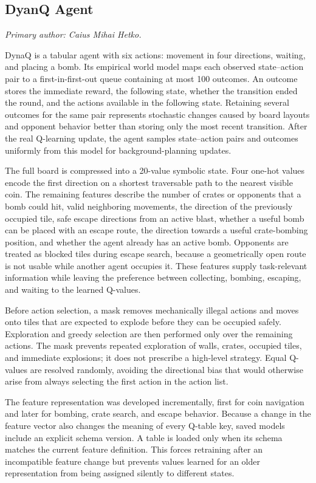 \documentclass[article, 10pt]{IEEEtran}
\begin{document}
\subsection{DyanQ Agent}\label{subsec:DynaQ Methods}\label{sec:dyna_method}

\textit{Primary author: Caius Mihai Hetko.}

DynaQ is a tabular agent with six actions: movement in four directions, waiting, and placing a bomb. Its empirical world model maps each observed state--action pair to a first-in-first-out queue containing at most 100 outcomes. An outcome stores the immediate reward, the following state, whether the transition ended the round, and the actions available in the following state. Retaining several outcomes for the same pair represents stochastic changes caused by board layouts and opponent behavior better than storing only the most recent transition. After the real Q-learning update, the agent samples state--action pairs and outcomes uniformly from this model for background-planning updates.

The full board is compressed into a 20-value symbolic state. Four one-hot values encode the first direction on a shortest traversable path to the nearest visible coin. The remaining features describe the number of crates or opponents that a bomb could hit, valid neighboring movements, the direction of the previously occupied tile, safe escape directions from an active blast, whether a useful bomb can be placed with an escape route, the direction towards a useful crate-bombing position, and whether the agent already has an active bomb. Opponents are treated as blocked tiles during escape search, because a geometrically open route is not usable while another agent occupies it. These features supply task-relevant information while leaving the preference between collecting, bombing, escaping, and waiting to the learned Q-values.

Before action selection, a mask removes mechanically illegal actions and moves onto tiles that are expected to explode before they can be occupied safely. Exploration and greedy selection are then performed only over the remaining actions. The mask prevents repeated exploration of walls, crates, occupied tiles, and immediate explosions; it does not prescribe a high-level strategy. Equal Q-values are resolved randomly, avoiding the directional bias that would otherwise arise from always selecting the first action in the action list.

The feature representation was developed incrementally, first for coin navigation and later for bombing, crate search, and escape behavior. Because a change in the feature vector also changes the meaning of every Q-table key, saved models include an explicit schema version. A table is loaded only when its schema matches the current feature definition. This forces retraining after an incompatible feature change but prevents values learned for an older representation from being assigned silently to different states.
\end{document}
